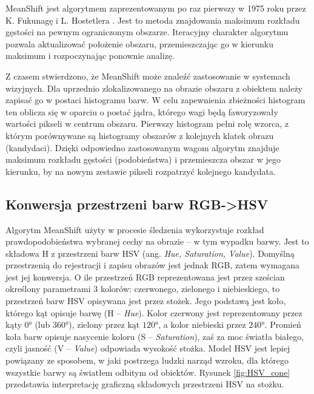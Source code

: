MeanShift jest algorytmem zaprezentowanym po raz pierwszy w 1975 roku przez K. Fukunagę i L. Hostetlera \cite{Fukunaga}. Jest to metoda znajdowania maksimum rozkładu gęstości na pewnym ograniczonym obszarze. Iteracyjny charakter algorytmu pozwala aktualizować położenie obszaru, przemieszczając go w kierunku maksimum i rozpoczynając ponownie analizę.

Z czasem stwierdzono, że MeanShift może znaleźć zastosowanie w systemach wizyjnych. Dla uprzednio zlokalizowanego na obrazie obszaru z obiektem należy zapisać go w postaci histogramu barw. W celu zapewnienia zbieżności histogram ten oblicza się w oparciu o postać jądra, którego wagi będą faworyzowały wartości pikseli w centrum obszaru. Pierwszy histogram pełni rolę wzorca, z którym porównywane są histogramy obszarów z kolejnych klatek obrazu (kandydaci). Dzięki odpowiedno zastosowanym wagom algorytm znajduje maksimum rozkładu gęstości (podobieństwa) i przemieszcza obszar w jego kierunku, by na nowym zestawie pikseli rozpatrzyć kolejnego kandydata.

\subsection{Konwersja przestrzeni barw RGB->HSV}
\label{sec:rgb2hsv} %


Algorytm MeanShift użyty w procesie śledzenia wykorzystuje rozkład prawdopodobieństwa wybranej cechy na obrazie -- w tym wypadku barwy. 
Jest to składowa H z przestrzeni barw HSV (ang. \textit{Hue, Saturation, Value}). 
Domyślną przestrzenią do rejestracji i zapisu obrazów jest jednak RGB, zatem wymagana jest jej konwersja. 
O ile przestrzeń RGB reprezentowana jest przez sześcian określony parametrami 3 kolorów: czerwonego, zielonego i niebieskiego, to przestrzeń barw HSV opisywana jest przez stożek. 
Jego podstawą jest koło, którego kąt opisuje barwę (H -- \textit{Hue}). %
Kolor czerwony jest reprezentowany przez kąty $0$\si{\degree} (lub $360$\si{\degree}), zielony przez kąt $120$\si{\degree}, a kolor niebieski przez $240$\si{\degree}. 
Promień koła barw opisuje nasycenie koloru (S -- \textit{Saturation}), zaś za moc światła białego, czyli jasność (V -- \textit{Value}) odpowiada wysokość stożka. 
Model HSV jest lepiej powiązany ze sposobem, w jaki postrzega ludzki narząd wzroku, dla którego wszystkie barwy są światłem odbitym od obiektów.
Rysunek \ref{fig:HSV_cone} przedstawia interpretację graficzną składowych przestrzeni HSV na stożku.

